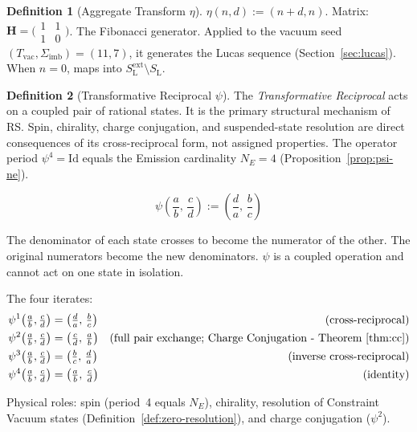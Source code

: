 \documentclass[11pt, letterpaper]{article}
\newcommand{\SL}{S_{\mathrm{L}}}
\newcommand{\SLe}{S_{\mathrm{L}}^{\mathrm{ext}}}
\newcommand{\aop}{\eta}
\newcommand{\Sigimb}{\Sigma_{\mathrm{imb}}}
\theoremstyle{definition}
\newtheorem{definition}{Definition}[section]
\theoremstyle{plain}
\begin{document}
\begin{definition}[Aggregate Transform $\aop$]\label{def:aop}
$\aop(n,d):=(n+d,n)$.
Matrix: $\mathbf{H}=\bigl(\begin{smallmatrix}1&1\\1&0\end{smallmatrix}\bigr)$.
The Fibonacci generator.  Applied to the vacuum seed
$(T_{\mathrm{vac}},\Sigimb)=(11,7)$, it generates the Lucas sequence
(Section~\ref{sec:lucas}).  When $n=0$, maps into $\SLe\setminus\SL$.
\end{definition}


\begin{definition}[Transformative Reciprocal $\psi$]\label{def:rop}
The \emph{Transformative Reciprocal} acts on a coupled pair of rational states.
It is the primary structural mechanism of RS\@.  Spin, chirality, charge
conjugation, and suspended-state resolution are direct consequences of its
cross-reciprocal form, not assigned properties.  The operator period
$\psi^4=\mathrm{Id}$ equals the Emission cardinality $N_E=4$
(Proposition~\ref{prop:psi-ne}).

\[
\psi\!\left(\frac{a}{b},\,\frac{c}{d}\right) := \left(\frac{d}{a},\,\frac{b}{c}\right)
\]

The denominator of each state crosses to become the numerator of the other.
The original numerators become the new denominators.
$\psi$ is a coupled operation and cannot act on one state in isolation.

The four iterates:
\begin{align*}
\psi^1\!\left(\tfrac{a}{b},\tfrac{c}{d}\right)
  &= \left(\tfrac{d}{a},\,\tfrac{b}{c}\right)
  & \text{(cross-reciprocal)} \\
\psi^2\!\left(\tfrac{a}{b},\tfrac{c}{d}\right)
  &= \left(\tfrac{c}{d},\,\tfrac{a}{b}\right)
  & \text{(full pair exchange; Charge Conjugation - Theorem~\ref{thm:cc})} \\
\psi^3\!\left(\tfrac{a}{b},\tfrac{c}{d}\right)
  &= \left(\tfrac{b}{c},\,\tfrac{d}{a}\right)
  & \text{(inverse cross-reciprocal)} \\
\psi^4\!\left(\tfrac{a}{b},\tfrac{c}{d}\right)
  &= \left(\tfrac{a}{b},\,\tfrac{c}{d}\right)
  & \text{(identity)}
\end{align*}

Physical roles: spin (period~4 equals $N_E$), chirality, resolution of
Constraint Vacuum states (Definition~\ref{def:zero-resolution}), and
charge conjugation ($\psi^2$).
\end{definition}
\end{document}
